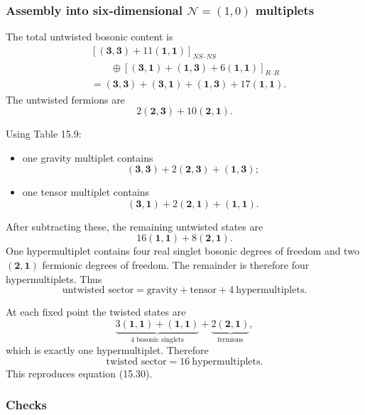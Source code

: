\documentclass[
  10pt,
  a4paper,
  openany]{book}
\providecommand{\tightlist}{%
  \setlength{\itemsep}{0pt}\setlength{\parskip}{0pt}}
\begin{document}
\subsubsection{\texorpdfstring{Assembly into six-dimensional
\(\mathcal N=(1,0)\)
multiplets}{Assembly into six-dimensional \textbackslash mathcal N=(1,0) multiplets}}\label{assembly-into-six-dimensional-mathcal-n10-multiplets}

The total untwisted bosonic content is \[
\begin{aligned}
&\left[
(\mathbf3,\mathbf3)
+
11(\mathbf1,\mathbf1)
\right]_{NS\text{--}NS}\\
&\qquad
\oplus
\left[
(\mathbf3,\mathbf1)
+
(\mathbf1,\mathbf3)
+
6(\mathbf1,\mathbf1)
\right]_{R\text{--}R}\\
&=
(\mathbf3,\mathbf3)
+
(\mathbf3,\mathbf1)
+
(\mathbf1,\mathbf3)
+
17(\mathbf1,\mathbf1).
\end{aligned}
\] The untwisted fermions are \[
2(\mathbf2,\mathbf3)
+
10(\mathbf2,\mathbf1).
\]

Using Table 15.9:

\begin{itemize}
\tightlist
\item
  one gravity multiplet contains \[
  (\mathbf3,\mathbf3)
  +2(\mathbf2,\mathbf3)
  +(\mathbf1,\mathbf3);
  \]
\item
  one tensor multiplet contains \[
  (\mathbf3,\mathbf1)
  +2(\mathbf2,\mathbf1)
  +(\mathbf1,\mathbf1).
  \]
\end{itemize}

After subtracting these, the remaining untwisted states are \[
16(\mathbf1,\mathbf1)
+
8(\mathbf2,\mathbf1).
\] One hypermultiplet contains four real singlet bosonic degrees of
freedom and two \((\mathbf2,\mathbf1)\) fermionic degrees of freedom.
The remainder is therefore four hypermultiplets. Thus \[
\boxed{
\text{untwisted sector}
=
\text{gravity}
+
\text{tensor}
+
4\ \text{hypermultiplets}
}.
\]

At each fixed point the twisted states are \[
\underbrace{
3(\mathbf1,\mathbf1)
+
(\mathbf1,\mathbf1)
}_{4\text{ bosonic singlets}}
+
\underbrace{
2(\mathbf2,\mathbf1)
}_{\text{fermions}},
\] which is exactly one hypermultiplet. Therefore \[
\boxed{
\text{twisted sector}
=
16\ \text{hypermultiplets}
}.
\] This reproduces equation (15.30).

\subsubsection{Checks}\label{checks-20}
\end{document}
